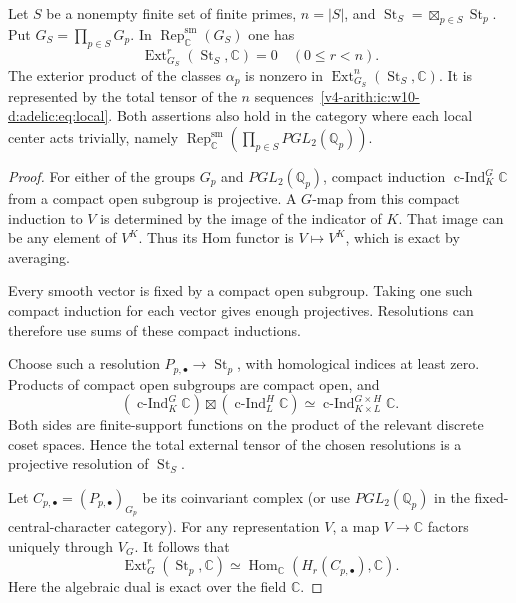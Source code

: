 \begin{proposition}\label{v4-arith:ic:w10-d:adelic:prop:finite}
Let $S$ be a nonempty finite set of finite primes, $n=|S|$, and
$\operatorname{St}_S=\boxtimes_{p\in S}\operatorname{St}_p$. Put $G_S=\prod_{p\in S}G_p$.
In $\operatorname{Rep}^{\mathrm{sm}}_{\mathbb C}(G_S)$ one has
\[
 \operatorname{Ext}^r_{G_S}(\operatorname{St}_S,\mathbb C)=0\quad(0\le r<n).
\]
The exterior product of the classes $\alpha_p$ is nonzero in
$\operatorname{Ext}^n_{G_S}(\operatorname{St}_S,\mathbb C)$. It is represented by the total tensor
of the $n$ sequences~\eqref{v4-arith:ic:w10-d:adelic:eq:local}.
Both assertions also hold in the category where each local center acts
trivially, namely $\operatorname{Rep}^{\mathrm{sm}}_{\mathbb C}(\prod_{p\in S}PGL_2(\mathbb Q_p))$.
\end{proposition}
\begin{proof}
For either of the groups $G_p$ and $PGL_2(\mathbb Q_p)$, compact induction
$\operatorname{c-Ind}_K^G\mathbb C$ from a compact open subgroup is projective. A $G$-map from this compact induction to $V$ is determined
by the image of the indicator of $K$.
That image can be any element of $V^K$.
Thus its Hom functor is $V\mapsto V^K$, which is exact by averaging.

Every smooth vector is fixed by a compact open subgroup. Taking one such compact induction for each vector gives enough
projectives. Resolutions can therefore use sums of these compact inductions.

Choose such a resolution $P_{p,\bullet}\to\operatorname{St}_p$, with homological
indices at least zero. Products of compact open subgroups are compact
open, and
\[
 \left(\operatorname{c-Ind}_K^G\mathbb C\right)\boxtimes
 \left(\operatorname{c-Ind}_L^H\mathbb C\right)
 \simeq\operatorname{c-Ind}_{K\times L}^{G\times H}\mathbb C.
\]
Both sides are finite-support functions on the product of the relevant
discrete coset spaces. Hence the total external tensor of the chosen
resolutions is a projective resolution of $\operatorname{St}_S$.

Let $C_{p,\bullet}=(P_{p,\bullet})_{G_p}$ be its coinvariant complex
(or use $PGL_2(\mathbb Q_p)$ in the fixed-central-character category).
For any representation $V$, a map $V\to\mathbb C$ factors uniquely through
$V_G$. It follows that
\begin{equation}\label{v4-arith:ic:w10-d:adelic:eq:coinvariant}
 \operatorname{Ext}^r_G(\operatorname{St}_p,\mathbb C)
 \simeq\operatorname{Hom}_{\mathbb C}(H_r(C_{p,\bullet}),\mathbb C).
\end{equation}
Here the algebraic dual is exact over the field $\mathbb C$.


\end{proof}
